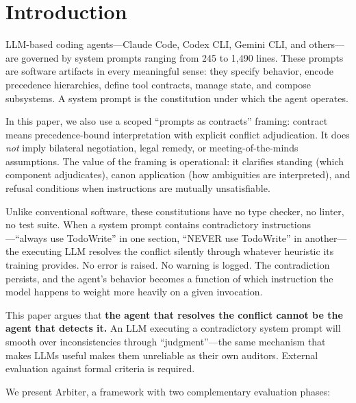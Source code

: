 \documentclass[11pt,a4paper]{article}
\begin{document}
\section{Introduction}
\label{sec:introduction}

LLM-based coding agents---Claude Code, Codex CLI, Gemini CLI, and
others---are governed by system prompts ranging from 245 to 1,490
lines. These prompts are software artifacts in every meaningful sense:
they specify behavior, encode precedence hierarchies, define tool
contracts, manage state, and compose subsystems. A system prompt is the
constitution under which the agent operates.

In this paper, we also use a scoped ``prompts as contracts'' framing:
contract means precedence-bound interpretation with explicit conflict
adjudication. It does \emph{not} imply bilateral negotiation, legal
remedy, or meeting-of-the-minds assumptions. The value of the framing is
operational: it clarifies standing (which component adjudicates), canon
application (how ambiguities are interpreted), and refusal conditions
when instructions are mutually unsatisfiable.

Unlike conventional software, these constitutions have no type checker,
no linter, no test suite. When a system prompt contains contradictory
instructions---``always use TodoWrite'' in one section, ``NEVER use
TodoWrite'' in another---the executing LLM resolves the conflict
silently through whatever heuristic its training provides. No error is
raised. No warning is logged. The contradiction persists, and the
agent's behavior becomes a function of which instruction the model
happens to weight more heavily on a given invocation.

This paper argues that \textbf{the agent that resolves the conflict
cannot be the agent that detects it.} An LLM executing a contradictory
system prompt will smooth over inconsistencies through
``judgment''---the same mechanism that makes LLMs useful makes them
unreliable as their own auditors. External evaluation against formal
criteria is required.

We present Arbiter, a framework with two complementary evaluation
phases:
\end{document}
